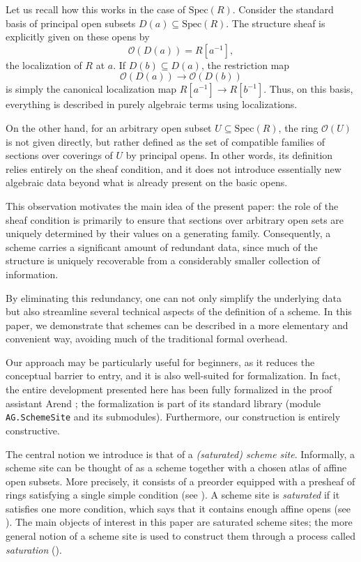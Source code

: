\documentclass[reqno]{amsart}
\theoremstyle{definition}
\theoremstyle{remark}
\numberwithin{figure}{section}
\begin{document}
Let us recall how this works in the case of $\mathrm{Spec}(R)$.
Consider the standard basis of principal open subsets $D(a) \subseteq \mathrm{Spec}(R)$. The structure sheaf is explicitly given on these opens by
\[ \mathcal{O}(D(a)) = R[a^{-1}], \]
the localization of $R$ at $a$. If $D(b) \subseteq D(a)$, the restriction map
\[ \mathcal{O}(D(a)) \to \mathcal{O}(D(b)) \]
is simply the canonical localization map $R[a^{-1}] \to R[b^{-1}]$.
Thus, on this basis, everything is described in purely algebraic terms using localizations.

On the other hand, for an arbitrary open subset $U \subseteq \mathrm{Spec}(R)$,
the ring $\mathcal{O}(U)$ is not given directly, but rather defined as the set of compatible families of sections over coverings of $U$ by principal opens.
In other words, its definition relies entirely on the sheaf condition, and it does not introduce essentially new algebraic data beyond what is already present on the basic opens.

This observation motivates the main idea of the present paper: the role of the sheaf condition is primarily to ensure that sections over arbitrary open sets are uniquely determined by their values on a generating family.
Consequently, a scheme carries a significant amount of redundant data, since much of the structure is uniquely recoverable from a considerably smaller collection of information.

By eliminating this redundancy, one can not only simplify the underlying data but also streamline several technical aspects of the definition of a scheme.
In this paper, we demonstrate that schemes can be described in a more elementary and convenient way, avoiding much of the traditional formal overhead.

Our approach may be particularly useful for beginners, as it reduces the conceptual barrier to entry, and it is also well-suited for formalization.
In fact, the entire development presented here has been fully formalized in the proof assistant Arend \cite{arend};
the formalization is part of its standard library \cite{arend-lib} (module \texttt{AG.SchemeSite} and its submodules).
Furthermore, our construction is entirely constructive.

The central notion we introduce is that of a \emph{(saturated) scheme site}.
Informally, a scheme site can be thought of as a scheme together with a chosen atlas of affine open subsets.
More precisely, it consists of a preorder equipped with a presheaf of rings satisfying a single simple condition (see ).
A scheme site is \emph{saturated} if it satisfies one more condition, which says that it contains enough affine opens (see ).
The main objects of interest in this paper are saturated scheme sites; the more general notion of a scheme site is used to construct them through a process called \emph{saturation} ().
\end{document}
